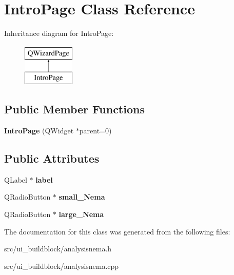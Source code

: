 \hypertarget{classIntroPage}{}\section{Intro\+Page Class Reference}
\label{classIntroPage}
Inheritance diagram for Intro\+Page\+:\begin{figure}[H]
\begin{center}
\leavevmode
\includegraphics[height=2.000000cm]{classIntroPage}
\end{center}
\end{figure}
\subsection*{Public Member Functions}
\begin{DoxyCompactItemize}
\item 
\mbox{\label{classIntroPage_a1542ddeba40ea1e6d5f968829876c95d}} 
{\bfseries Intro\+Page} (Q\+Widget $\ast$parent=0)
\end{DoxyCompactItemize}
\subsection*{Public Attributes}
\begin{DoxyCompactItemize}
\item 
\mbox{\label{classIntroPage_a5ac8b336d2b70f9b418fd6196685398f}} 
Q\+Label $\ast$ {\bfseries label}
\item 
\mbox{\label{classIntroPage_a26d5d8b3128092050d64490bc826ffa8}} 
Q\+Radio\+Button $\ast$ {\bfseries small\+\_\+\+Nema}
\item 
\mbox{\label{classIntroPage_a3de077f12907f403d9de2004e580b55d}} 
Q\+Radio\+Button $\ast$ {\bfseries large\+\_\+\+Nema}
\end{DoxyCompactItemize}


The documentation for this class was generated from the following files\+:\begin{DoxyCompactItemize}
\item 
src/ui\+\_\+buildblock/analysisnema.\+h\item 
src/ui\+\_\+buildblock/analysisnema.\+cpp\end{DoxyCompactItemize}
